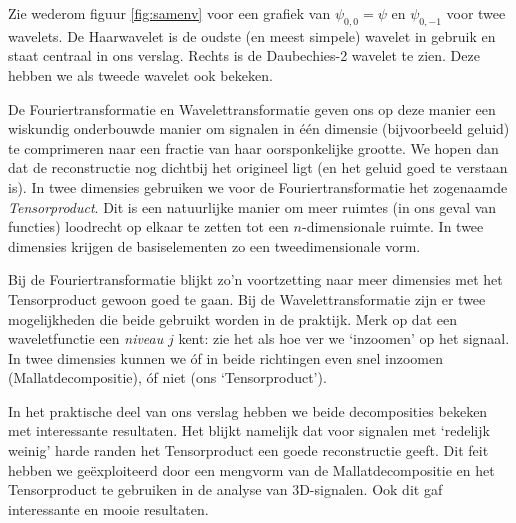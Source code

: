 Zie wederom figuur \ref{fig:samenv} voor een grafiek van $\psi_{0,0} = \psi$ en $\psi_{0,-1}$ voor twee wavelets. De Haarwavelet is de oudste (en meest simpele) wavelet in gebruik en staat centraal in ons verslag. Rechts is de Daubechies-2 wavelet te zien. Deze hebben we als tweede wavelet ook bekeken.

De Fouriertransformatie en Wavelettransformatie geven ons op deze manier een wiskundig onderbouwde manier om signalen in \'e\'en dimensie (bijvoorbeeld geluid) te comprimeren naar een fractie van haar oorsponkelijke grootte. We hopen dan dat de reconstructie nog dichtbij het origineel ligt (en het geluid goed te verstaan is). In twee dimensies gebruiken we voor de Fouriertransformatie het zogenaamde \emph{Tensorproduct}. Dit is een natuurlijke manier om meer ruimtes (in ons geval van functies) loodrecht op elkaar te zetten tot een $n$-dimensionale ruimte. In twee dimensies krijgen de basiselementen zo een tweedimensionale vorm.

Bij de Fouriertransformatie blijkt zo'n voortzetting naar meer dimensies met het Tensorproduct gewoon goed te gaan. Bij de Wavelettransformatie zijn er twee mogelijkheden die beide gebruikt worden in de praktijk. Merk op dat een waveletfunctie een \emph{niveau} $j$ kent: zie het als hoe ver we `inzoomen' op het signaal. In twee dimensies kunnen we \'of in beide richtingen even snel inzoomen (Mallatdecompositie), \'of niet (ons `Tensorproduct').

In het praktische deel van ons verslag hebben we beide decomposities bekeken met interessante resultaten. Het blijkt namelijk dat voor signalen met `redelijk weinig' harde randen het Tensorproduct een goede reconstructie geeft. Dit feit hebben we ge\"exploiteerd door een mengvorm van de Mallatdecompositie en het Tensorproduct te gebruiken in de analyse van 3D-signalen. Ook dit gaf interessante en mooie resultaten.

